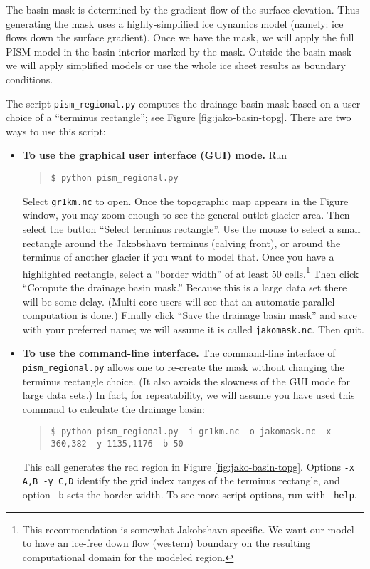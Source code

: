 The basin mask is determined by the gradient flow of the surface elevation.  Thus generating the mask uses a highly-simplified ice dynamics model (namely: ice flows down the surface gradient).  Once we have the mask, we will apply the full PISM model in the basin interior marked by the mask.  Outside the basin mask we will apply simplified models or use the whole ice sheet results as boundary conditions.

The script \texttt{pism_regional.py} computes the drainage basin mask based on a user choice of a ``terminus rectangle''; see Figure \ref{fig:jako-basin-topg}.  There are two ways to use this script:
\begin{itemize}
\item \textbf{To use the graphical user interface (GUI) mode.}  Run
\begin{quote}\small
\begin{verbatim}
$ python pism_regional.py
\end{verbatim}
\normalsize\end{quote}
Select \texttt{gr1km.nc} to open.  Once the topographic map appears in the Figure window, you may zoom enough to see the general outlet glacier area.  Then select the button ``Select terminus rectangle''.  Use the mouse to select a small rectangle around the Jakobshavn terminus (calving front), or around the terminus of another glacier if you want to model that.  Once you have a highlighted rectangle, select a ``border width'' of at least 50 cells.\footnote{This recommendation is somewhat Jakobshavn-specific. We want our model to have an ice-free down flow (western) boundary on the resulting computational domain for the modeled region.}  Then click ``Compute the drainage basin mask.''  Because this is a large data set there will be some delay. (Multi-core users will see that an automatic parallel computation is done.)  Finally click ``Save the drainage basin mask'' and save with your preferred name; we will assume it is called \texttt{jakomask.nc}.  Then quit.
\item \textbf{To use the command-line interface.}  The command-line interface of \texttt{pism_regional.py} allows one to re-create the mask without changing the terminus rectangle choice.  (It also avoids the slowness of the GUI mode for large data sets.)  In fact, for repeatability, we will assume you have used this command to calculate the drainage basin:
\begin{quote}\small
\begin{verbatim}
$ python pism_regional.py -i gr1km.nc -o jakomask.nc -x 360,382 -y 1135,1176 -b 50
\end{verbatim}
\normalsize\end{quote}
This call generates the red region in Figure \ref{fig:jako-basin-topg}.  Options \texttt{-x A,B -y C,D} identify the grid index ranges of the terminus rectangle, and option \texttt{-b} sets the border width.  To see more script options, run with \texttt{--help}.
\end{itemize}

